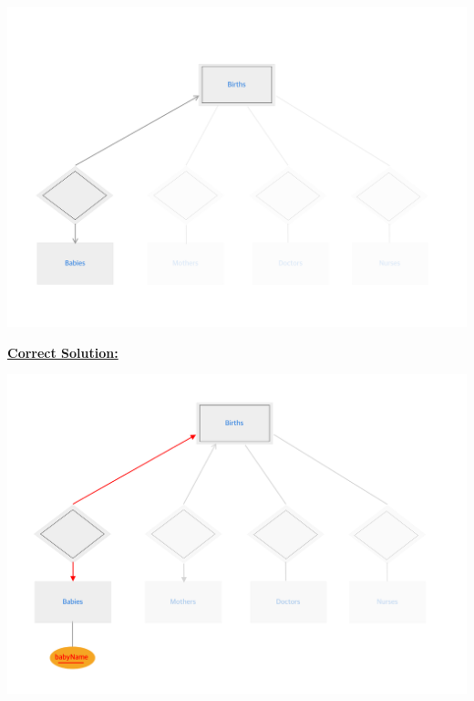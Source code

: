 \documentclass[12pt]{article}
\begin{document}
\begin{enumerate}[1.]
\begin{enumerate}[a)]
        \begin{center}
        \includegraphics[width=\linewidth]{images/worksheet_14_solution_59.png}
        \end{center}

        \bigskip

        \begin{mdframed}

            \underline{\textbf{Correct Solution:}}

            \bigskip

            \begin{center}
            \includegraphics[width=\linewidth]{images/worksheet_14_solution_66.png}
            \end{center}

        \end{mdframed}


\end{enumerate}
\end{enumerate}
\end{document}
